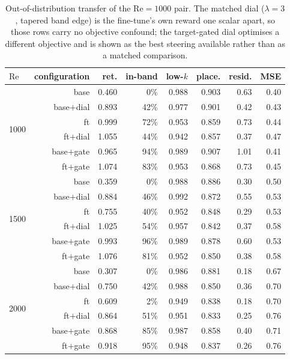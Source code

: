\begin{table}[t]
  \centering
  \caption{Out-of-distribution transfer of the $\mathrm{Re}=1000$ pair. The matched dial ($\lambda=3$, tapered band edge) is the fine-tune's own reward one scalar apart, so those rows carry no objective confound; the target-gated dial optimises a different objective and is shown as the best steering available rather than as a matched comparison.}
  \label{tab:transfer-all-dials}
  \begin{tabular}{lrrrrrrr}
    \toprule
    $\mathrm{Re}$ & configuration & ret. & in-band & low-$k$ & place. & resid. & MSE \\
    \midrule
    \multirow{6}{*}{1000} & base & 0.460 & 0\% & 0.988 & 0.903 & 0.63 & 0.40 \\
     & base$+$dial & 0.893 & 42\% & 0.977 & 0.901 & 0.42 & 0.43 \\
     & ft & 0.999 & 72\% & 0.953 & 0.859 & 0.73 & 0.44 \\
     & ft$+$dial & 1.055 & 44\% & 0.942 & 0.857 & 0.37 & 0.47 \\
     & base$+$gate & 0.965 & 94\% & 0.989 & 0.907 & 1.01 & 0.41 \\
     & ft$+$gate & 1.074 & 83\% & 0.953 & 0.868 & 0.73 & 0.45 \\
    \midrule
    \multirow{6}{*}{1500} & base & 0.359 & 0\% & 0.988 & 0.886 & 0.30 & 0.50 \\
     & base$+$dial & 0.884 & 46\% & 0.992 & 0.872 & 0.55 & 0.53 \\
     & ft & 0.755 & 40\% & 0.952 & 0.848 & 0.29 & 0.53 \\
     & ft$+$dial & 1.025 & 54\% & 0.957 & 0.842 & 0.37 & 0.58 \\
     & base$+$gate & 0.993 & 96\% & 0.989 & 0.878 & 0.60 & 0.53 \\
     & ft$+$gate & 1.076 & 81\% & 0.952 & 0.850 & 0.38 & 0.58 \\
    \midrule
    \multirow{6}{*}{2000} & base & 0.307 & 0\% & 0.986 & 0.881 & 0.18 & 0.67 \\
     & base$+$dial & 0.750 & 42\% & 0.988 & 0.850 & 0.36 & 0.70 \\
     & ft & 0.609 & 2\% & 0.949 & 0.838 & 0.18 & 0.70 \\
     & ft$+$dial & 0.864 & 51\% & 0.951 & 0.833 & 0.25 & 0.76 \\
     & base$+$gate & 0.868 & 85\% & 0.987 & 0.858 & 0.40 & 0.71 \\
     & ft$+$gate & 0.918 & 95\% & 0.948 & 0.837 & 0.26 & 0.76 \\

\end{tabular}
\end{table}
